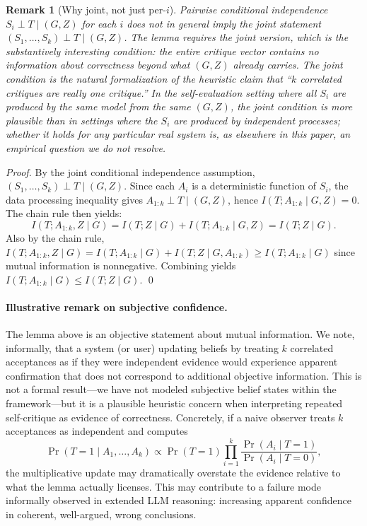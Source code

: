 \documentclass[11pt]{article}
\newtheorem{remark}[theorem]{Remark}
\begin{document}
\begin{remark}[Why joint, not just per-$i$]
Pairwise conditional independence $S_i \perp T \mid (G, Z)$ for each $i$ does \emph{not} in general imply the joint statement $(S_1, \ldots, S_k) \perp T \mid (G, Z)$. The lemma requires the joint version, which is the substantively interesting condition: the entire critique vector contains no information about correctness beyond what $(G, Z)$ already carries. The joint condition is the natural formalization of the heuristic claim that ``$k$ correlated critiques are really one critique.'' In the self-evaluation setting where all $S_i$ are produced by the same model from the same $(G, Z)$, the joint condition is more plausible than in settings where the $S_i$ are produced by independent processes; whether it holds for any particular real system is, as elsewhere in this paper, an empirical question we do not resolve.
\end{remark}

\begin{proof}
By the joint conditional independence assumption, $(S_1, \ldots, S_k) \perp T \mid (G, Z)$. Since each $A_i$ is a deterministic function of $S_i$, the data processing inequality gives $A_{1:k} \perp T \mid (G, Z)$, hence $I(T; A_{1:k} \mid G, Z) = 0$. The chain rule then yields:
\begin{equation}
I(T; A_{1:k}, Z \mid G) = I(T; Z \mid G) + I(T; A_{1:k} \mid G, Z) = I(T; Z \mid G).
\end{equation}
Also by the chain rule, $I(T; A_{1:k}, Z \mid G) = I(T; A_{1:k} \mid G) + I(T; Z \mid G, A_{1:k}) \geq I(T; A_{1:k} \mid G)$ since mutual information is nonnegative. Combining yields $I(T; A_{1:k} \mid G) \leq I(T; Z \mid G)$. \qed
\end{proof}

\paragraph{Illustrative remark on subjective confidence.} The lemma above is an objective statement about mutual information. We note, informally, that a system (or user) updating beliefs by treating $k$ correlated acceptances as if they were independent evidence would experience apparent confirmation that does not correspond to additional objective information. This is not a formal result---we have not modeled subjective belief states within the framework---but it is a plausible heuristic concern when interpreting repeated self-critique as evidence of correctness. Concretely, if a naive observer treats $k$ acceptances as independent and computes
\begin{equation}
\Pr(T = 1 \mid A_1, \ldots, A_k) \propto \Pr(T = 1) \prod_{i=1}^{k} \frac{\Pr(A_i \mid T = 1)}{\Pr(A_i \mid T = 0)},
\end{equation}
the multiplicative update may dramatically overstate the evidence relative to what the lemma actually licenses. This may contribute to a failure mode informally observed in extended LLM reasoning: increasing apparent confidence in coherent, well-argued, wrong conclusions.
\end{document}
